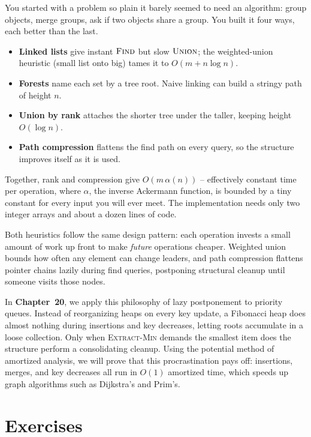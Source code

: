 You started with a problem so plain it barely seemed to need an algorithm:
group objects, merge groups, ask if two objects share a group. You built it four
ways, each better than the last.

\begin{itemize}
  \item \textbf{Linked lists} give instant $\textsc{Find}$ but slow
        $\textsc{Union}$; the weighted-union heuristic (small list onto big)
        tames it to $O(m + n \log n)$.
  \item \textbf{Forests} name each set by a tree root. Naive linking can build
        a stringy path of height $n$.
  \item \textbf{Union by rank} attaches the shorter tree under the taller,
        keeping height $O(\log n)$.
  \item \textbf{Path compression} flattens the find path on every query, so
        the structure improves itself as it is used.
\end{itemize}

Together, rank and compression give $O(m\,\alpha(n))$ -- effectively constant
time per operation, where $\alpha$, the inverse Ackermann function, is bounded
by a tiny constant for every input you will ever meet. The implementation needs
only two integer arrays and about a dozen lines of code.

\begin{aestheticbox}
Both heuristics follow the same design pattern: each operation invests a small
amount of work up front to make \emph{future} operations cheaper. Weighted union
bounds how often any element can change leaders, and path compression flattens
pointer chains lazily during find queries, postponing structural cleanup until
someone visits those nodes.
\end{aestheticbox}

In \textbf{Chapter~20}, we apply this philosophy of lazy postponement
to priority queues. Instead of reorganizing heaps on every key update, a Fibonacci heap
does almost nothing during insertions and key decreases, letting roots accumulate in a loose collection.
Only when \textsc{Extract-Min} demands the smallest item does the structure perform a
consolidating cleanup. Using the potential method of amortized analysis, we will prove that this
procrastination pays off: insertions, merges, and key decreases all run in $O(1)$
amortized time, which speeds up graph algorithms such as Dijkstra's and Prim's.

\section{Exercises}
\label{ch19:exercises}

